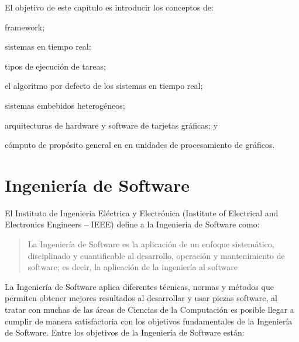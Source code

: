 
    El objetivo de este capítulo es introducir los conceptos de: 
    \begin{inparaenum}
    \item framework;
    \item sistemas en tiempo real;
    \item tipos de ejecución de tareas; 
    \item el algoritmo por defecto de los sistemas en tiempo real; 
    \item sistemas embebidos heterogéneos; 
    \item arquitecturas de hardware y software de tarjetas gráficas; y 
    \item cómputo de propósito general en en unidades de procesamiento de gráficos.
    \end{inparaenum}
     \section{Ingeniería de Software}

 El Instituto de Ingeniería Eléctrica y Electrónica (Institute of Electrical and Electronics Engineers – IEEE) define a la Ingeniería de Software como:

\begin{quote}
La Ingeniería de Software\cite{IeeeSG} es la aplicación de un enfoque sistemático, disciplinado y cuantificable al desarrollo, operación y mantenimiento de software; es decir, la aplicación de la ingeniería al software
\end{quote}

La Ingeniería de Software aplica diferentes técnicas, normas y métodos que permiten obtener mejores resultados al desarrollar y usar piezas software, al tratar con muchas de las áreas de Ciencias de la Computación es posible llegar a cumplir de manera satisfactoria con los objetivos fundamentales de la Ingeniería de Software. Entre los objetivos de la Ingeniería de Software están\cite{enSWE}:


